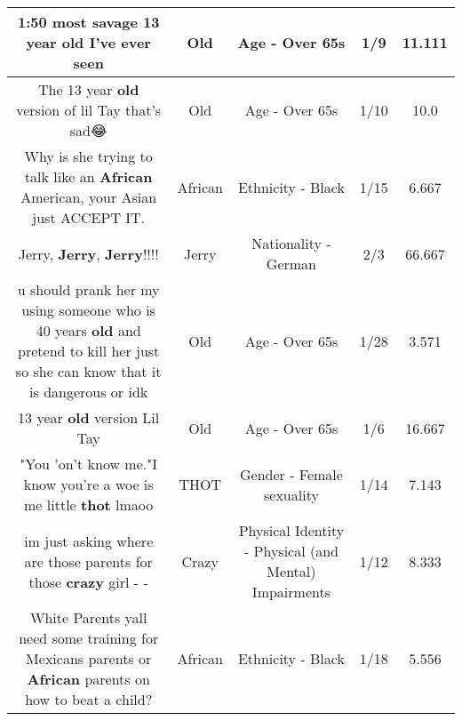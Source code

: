 \documentclass[11pt]{article}
\newlength\mylength
\begin{document}
\begin{center}
\begin{longtable}{|C{.65\mylength}|C{.30\mylength}|C{.12\mylength}|C{.12\mylength}|C{.12\mylength}|}
  \small 1:50 most savage 13 year \textbf{old} I've ever seen\normalsize   & Old & Age - Over 65s & 1/9 & 11.111 \\  \hline
  \small The 13 year \textbf{old} version of lil Tay that's sad😂\normalsize   & Old & Age - Over 65s & 1/10 & 10.0 \\  \hline
  \small Why is she trying to talk like an \textbf{African} American, your Asian just ACCEPT IT.\normalsize   & African & Ethnicity - Black & 1/15 & 6.667 \\  \hline
  \small Jerry, \textbf{Jerry}, \textbf{Jerry}!!!!\normalsize   & Jerry & Nationality - German & 2/3 & 66.667 \\  \hline
  \small u should prank her my using someone who is 40 years \textbf{old} and pretend to kill her just so she can know that it is dangerous or idk\normalsize   & Old & Age - Over 65s & 1/28 & 3.571 \\  \hline
  \small 13 year \textbf{old} version Lil Tay\normalsize   & Old & Age - Over 65s & 1/6 & 16.667 \\  \hline
  \small "You 'on't know me."I know you're a woe is me little \textbf{thot} lmaoo\normalsize   & THOT & Gender - Female sexuality & 1/14 & 7.143 \\  \hline
  \small im just asking where are those parents for those \textbf{crazy} girl - -\normalsize   & Crazy & Physical Identity - Physical (and Mental) Impairments & 1/12 & 8.333 \\  \hline
  \small White Parents yall need some training for Mexicans parents or \textbf{African} parents on how to beat a child?\normalsize   & African & Ethnicity - Black & 1/18 & 5.556 \\  \hline

\end{longtable}
\end{center}
\end{document}
